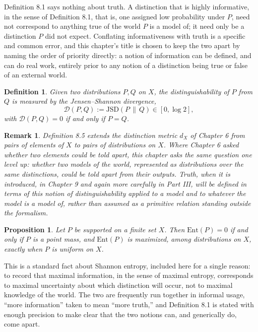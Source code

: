 \documentclass[11pt]{book}
\newtheorem{definition}[theorem]{Definition}
\newtheorem{proposition}[theorem]{Proposition}
\newtheorem{remark}[theorem]{Remark}
\begin{document}
Definition 8.1 says nothing about truth. A distinction that is highly informative, in the sense of Definition 8.1, that is, one assigned low probability under $P$, need not correspond to anything true of the world $P$ is a model of; it need only be a distinction $P$ did not expect. Conflating informativeness with truth is a specific and common error, and this chapter's title is chosen to keep the two apart by naming the order of priority directly: a notion of information can be defined, and can do real work, entirely prior to any notion of a distinction being true or false of an external world.

\begin{definition}
Given two distributions $P, Q$ on $X$, the \emph{distinguishability} of $P$ from $Q$ is measured by the Jensen–Shannon divergence,
\[
\mathcal D(P, Q) := \mathrm{JSD}(P \,\|\, Q) \in [0, \log 2],
\]
with $\mathcal D(P,Q) = 0$ if and only if $P = Q$.
\end{definition}

\begin{remark}
Definition 8.5 extends the distinction metric $d_X$ of Chapter 6 from pairs of elements of $X$ to pairs of distributions on $X$. Where Chapter 6 asked whether two elements could be told apart, this chapter asks the same question one level up: whether two models of the world, represented as distributions over the same distinctions, could be told apart from their outputs. Truth, when it is introduced, in Chapter 9 and again more carefully in Part III, will be defined in terms of this notion of distinguishability applied to a model and to whatever the model is a model of, rather than assumed as a primitive relation standing outside the formalism.
\end{remark}

\begin{proposition}
Let $P$ be supported on a finite set $X$. Then $\mathrm{Ent}(P) = 0$ if and only if $P$ is a point mass, and $\mathrm{Ent}(P)$ is maximized, among distributions on $X$, exactly when $P$ is uniform on $X$.
\end{proposition}

This is a standard fact about Shannon entropy, included here for a single reason: to record that maximal information, in the sense of maximal entropy, corresponds to maximal uncertainty about which distinction will occur, not to maximal knowledge of the world. The two are frequently run together in informal usage, ``more information'' taken to mean ``more truth,'' and Definition 8.1 is stated with enough precision to make clear that the two notions can, and generically do, come apart.
\end{document}
